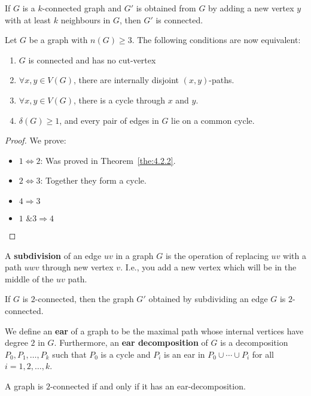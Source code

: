 \begin{lemma}
	If $G$ is a $k$-connected graph and $G'$ is obtained from $G$ by adding a new vertex $y$ with at least $k$ neighbours in $G$, then $G'$ is connected.
\end{lemma}

\begin{theorem}
	Let $G$ be a graph with $n(G) \ge 3$. The following conditions are now equivalent:
	\begin{enumerate}
		\item $G$ is connected and has no cut-vertex
		\item \(\forall x, y \in V(G)\), there are internally disjoint $(x,y)$-paths.
		\item \(\forall x,y \in V(G)\), there is a cycle through $x$ and $y$.
		\item \(\delta(G) \ge 1\), and every pair of edges in $G$ lie on a common cycle.
	\end{enumerate}
\end{theorem}

\begin{proof}
	We prove:
	\begin{itemize}
		\item $1 \iff 2$: Was proved in Theorem~\ref{the:4.2.2}.
		\item $2 \iff 3$: Together they form a cycle.
		\item $4 \Rightarrow 3$
		\item $1 \text{ \& } 3 \Rightarrow 4$
	\end{itemize}
\end{proof}

A \textbf{subdivision} of an edge $uv$ in a graph $G$ is the operation of replacing $uv$ with a path $uwv$ through new vertex $v$. I.e., you add a new vertex which will be in the middle of the $uv$ path.

\begin{corollary}
	If $G$ is $2$-connected, then the graph $G'$ obtained by subdividing an edge $G$ is $2$-connected.
\end{corollary}

We define an \textbf{ear} of a graph to be the maximal path whose internal vertices have degree $2$ in $G$. Furthermore, an \textbf{ear decomposition} of $G$ is a decomposition $P_{0},P_{1},\ldots, P_{k}$ such that $P_{0}$ is a cycle and $P_{i}$ is an ear in $P_{0} \cup \cdots \cup P_{i}$ for all $i = 1, 2, \ldots, k$.

\begin{theorem}
	A graph is $2$-connected if and only if it has an ear-decomposition.
\end{theorem}

